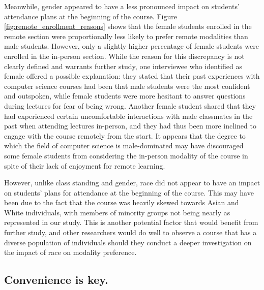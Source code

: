 Meanwhile, gender appeared to have a less pronounced impact on students' attendance plans at the beginning of the course. Figure \ref{fig:remote_enrollment_reasons} shows that the female students enrolled in the remote section were proportionally less likely to prefer remote modalities than male students. However, only a slightly higher percentage of female students were enrolled in the in-person section. While the reason for this discrepancy is not clearly defined and warrants further study, one interviewee who identified as female offered a possible explanation: they stated that their past experiences with computer science courses had been that male students were the most confident and outspoken, while female students were more hesitant to answer questions during lectures for fear of being wrong. Another female student shared that they had experienced certain uncomfortable interactions with male classmates in the past when attending lectures in-person, and they had thus been more inclined to engage with the course remotely from the start. It appears that the degree to which the field of computer science is male-dominated may have discouraged some female students from considering the in-person modality of the course in spite of their lack of enjoyment for remote learning.

However, unlike class standing and gender, race did not appear to have an impact on students' plans for attendance at the beginning of the course. This may have been due to the fact that the course was heavily skewed towards Asian and White individuals, with members of minority groups not being nearly as represented in our study. This is another potential factor that would benefit from further study, and other researchers would do well to observe a course that has a diverse population of individuals should they conduct a deeper investigation on the impact of race on modality preference.

\subsection{Convenience is key.}

